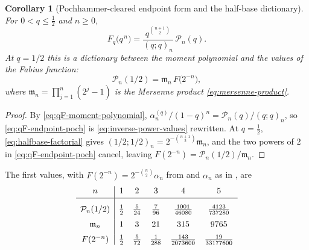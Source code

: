 \documentclass[11pt,oneside,openany]{book}
\newtheorem{corollary}[corollary]{Corollary}
\theoremstyle{definition}
\theoremstyle{remark}
\newcommand{\poch}[3]{(#1;#2)_{#3}}
\begin{document}
\begin{corollary}[Pochhammer-cleared endpoint form and the half-base dictionary]
\label{cor:qF-halfbase-dictionary}
For $0<q\le\tfrac12$ and $n\ge0$,
\begin{equation}\label{eq:qF-endpoint-poch}
 F_q\bigl(q^{\,n}\bigr)=\frac{q^{\binom{n+1}2}}{\poch qqn}\,\mathcal P_n(q).
\end{equation}
At $q=1/2$ this is a dictionary between the moment polynomial and the values of the Fabius
function:
\begin{equation}\label{eq:qF-halfbase-dictionary}
 \mathcal P_n(1/2)=\mathfrak m_n\,F\bigl(2^{-n}\bigr),
\end{equation}
where $\mathfrak m_n=\prod_{j=1}^{n}(2^j-1)$ is the Mersenne product
\eqref{eq:mersenne-product}.
\end{corollary}

\begin{proof}
By \eqref{eq:qF-moment-polynomial}, $\alpha^{(q)}_n/(1-q)^n=\mathcal P_n(q)/\poch qqn$, so
\eqref{eq:qF-endpoint-poch} is \eqref{eq:inverse-power-values} rewritten.  At $q=\tfrac12$,
\eqref{eq:halfbase-factorial} gives
$\poch{1/2}{1/2}n=2^{-\binom{n+1}2}\mathfrak m_n$, and the two powers of $2$ in
\eqref{eq:qF-endpoint-poch} cancel, leaving
$F(2^{-n})=\mathcal P_n(1/2)/\mathfrak m_n$.
\end{proof}

The first values, with $F(2^{-n})=2^{-\binom n2}\alpha_n$ from
 and $\alpha_n$ as in , are
\[
 \begin{array}{c|ccccc}
  n & 1 & 2 & 3 & 4 & 5\\[2pt]\hline
  \rule{0pt}{16pt}
  \mathcal P_n(1/2) & \frac12 & \frac5{24} & \frac7{96}
    & \frac{1001}{46080} & \frac{4123}{737280}\\[6pt]
  \mathfrak m_n & 1 & 3 & 21 & 315 & 9765\\[6pt]
  F(2^{-n}) & \frac12 & \frac5{72} & \frac1{288}
    & \frac{143}{2073600} & \frac{19}{33177600}
 \end{array}
\]
\end{document}

